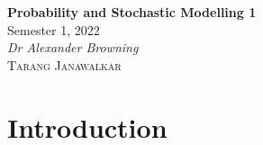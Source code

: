 \documentclass{article}
\date{}
\newcommand{\unitName}{Probability and Stochastic Modelling 1}
\newcommand{\unitTime}{Semester 1, 2022}
\newcommand{\unitCoordinator}{Dr Alexander Browning}
\newcommand{\documentAuthors}{\textsc{Tarang Janawalkar}}
\begin{document}
%
\begin{titlepage}
    \vspace*{\fill}
    \begin{center}
        \LARGE{\textbf{\unitName}} \\[0.1in]
        \normalsize{\unitTime} \\[0.2in]
        \normalsize\textit{\unitCoordinator} \\[0.2in]
        \documentAuthors
    \end{center}
    \vspace*{\fill}
    \doclicenseThis
    \thispagestyle{empty}
\end{titlepage}
\newpage
%
\tableofcontents
\newpage
%
\section{Introduction}
\end{document}
